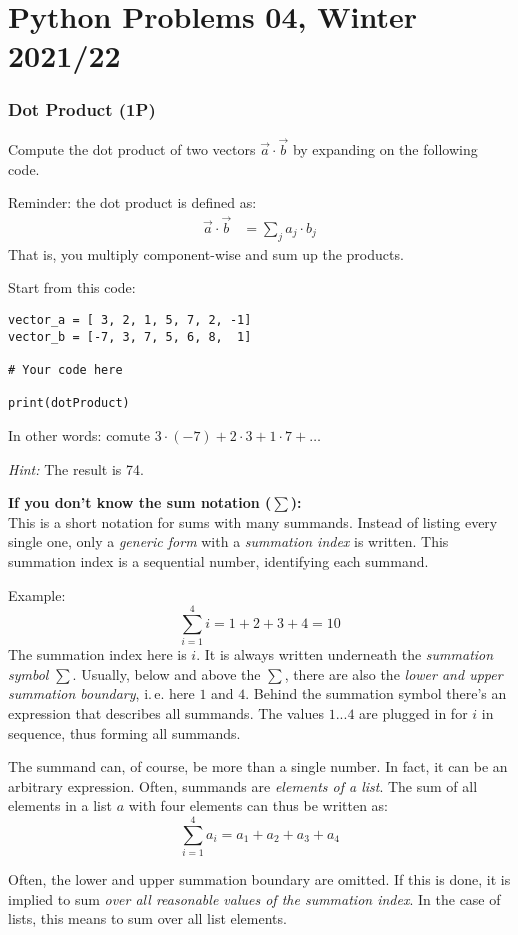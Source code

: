 \documentclass[
	ngerman,
	fontsize=10pt,
	parskip=half,
	titlepage=true,
	DIV=12
]{scrartcl}
\newcommand*{\ie}{i.\,e. }
\begin{document}
\part*{Python Problems 04, Winter 2021/22}
\section{Dot Product (1\;P)}
Compute the dot product of two vectors $\vec{a} \cdot \vec{b}$ by expanding on the following code.

Reminder: the dot product is defined as:
\begin{align*}
	\vec{a} \cdot \vec{b} &= \sum_{j} a_j \cdot b_j
\end{align*}
That is, you multiply component-wise and sum up the products.

Start from this code:
\begin{verbatim}
vector_a = [ 3, 2, 1, 5, 7, 2, -1]
vector_b = [-7, 3, 7, 5, 6, 8,  1]

# Your code here

print(dotProduct)
\end{verbatim}

In other words: comute $3 \cdot (-7) + 2 \cdot 3 + 1 \cdot 7 + \ldots$

\emph{Hint:} The result is 74.

\textbf{If you don't know the sum notation ($\sum$):}\\
This is a short notation for sums with many summands. Instead of listing every single one, only a \emph{generic form} with a \emph{summation index} is written. This summation index is a sequential number, identifying each summand.

Example:
\[\sum_{i=1}^4 i = 1 + 2 + 3 + 4 = 10 \]
The summation index here is $i$. It is always written underneath the \emph{summation symbol} $\sum$. Usually, below and above the $\sum$, there are also the \emph{lower and upper summation boundary}, \ie here $1$ and $4$. Behind the summation symbol there's an expression that describes all summands. The values $1 ... 4$ are plugged in for $i$ in sequence, thus forming all summands.

The summand can, of course, be more than a single number. In fact, it can be an arbitrary expression. Often, summands are \emph{elements of a list}. The sum of all elements in a list $a$ with four elements can thus be written as:
\[ \sum_{i=1}^4 a_i = a_1 + a_2 + a_3 + a_4 \]

Often, the lower and upper summation boundary are omitted. If this is done, it is implied to sum \emph{over all reasonable values of the summation index}. In the case of lists, this means to sum over all list elements.
\end{document}
